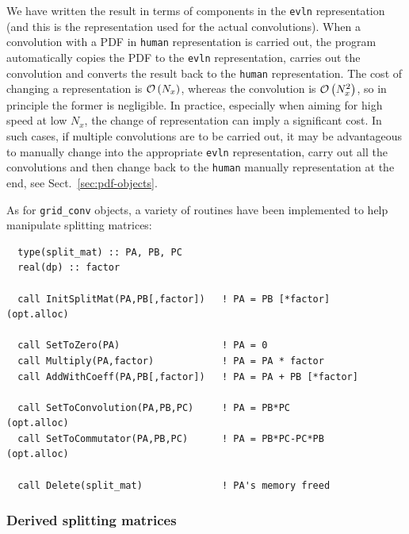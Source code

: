 \documentclass[12pt]{article}
\newcommand{\comment}[1]{\textbf{[#1]}}
\newcommand{\ttt}[1]{\texttt{#1}}
\newcommand{\order}[1]{{\cal O}\left(#1\right)}
\begin{document}
We have written the result in terms of components in the \ttt{evln}
representation (and this is the representation used for the actual
convolutions). When a convolution with a PDF in \ttt{human}
representation is carried out, the program automatically copies the
PDF to the \ttt{evln} representation, carries out the convolution and
converts the result back to the \ttt{human} representation.
%
The cost of changing a representation is $\order{N_x}$, whereas the
convolution is $\order{N^2_x}$, so in principle the former is
negligible. In practice, especially when aiming for high speed at low
$N_x$, the change of representation can imply a significant cost. In
such cases, if multiple convolutions are to be carried out, it may be
advantageous to manually change into the appropriate \ttt{evln}
representation, carry out all the convolutions and then change back to
the \ttt{human} manually representation at the end, see
Sect.~\ref{sec:pdf-objects}.
%

As for \ttt{grid\_conv} objects, a variety of routines have been
implemented to help manipulate splitting matrices:
\begin{lstlisting}
  type(split_mat) :: PA, PB, PC
  real(dp) :: factor

  call InitSplitMat(PA,PB[,factor])   ! PA = PB [*factor]   (opt.alloc)

  call SetToZero(PA)                  ! PA = 0
  call Multiply(PA,factor)            ! PA = PA * factor               
  call AddWithCoeff(PA,PB[,factor])   ! PA = PA + PB [*factor]

  call SetToConvolution(PA,PB,PC)     ! PA = PB*PC          (opt.alloc)
  call SetToCommutator(PA,PB,PC)      ! PA = PB*PC-PC*PB    (opt.alloc)
  
  call Delete(split_mat)              ! PA's memory freed
\end{lstlisting}


\subsubsection{Derived splitting matrices}
\label{sec:derived-split-matrices}
\end{document}
